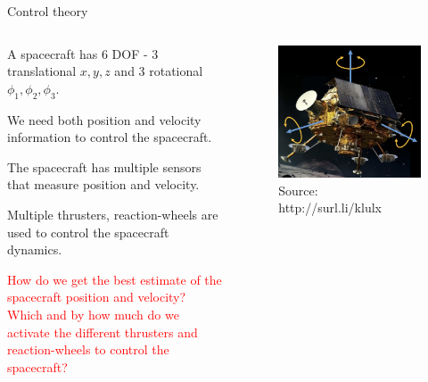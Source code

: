 \documentclass[aspectratio=169]{beamer}
\begin{document}
\begin{frame}{Control theory}
  \begin{columns}
    \begin{column}{0.5\textwidth}
      \vspace{0.2cm}
      A spacecraft has 6 DOF - 3 translational $x, y, z$ and 3 rotational $\phi_1, \phi_2, \phi_3$.

      We need both position and velocity information to control the spacecraft.
      \vspace{0.2cm}
      
      The spacecraft has multiple sensors that measure position and velocity.
      \vspace{0.2cm}
      
      Multiple thrusters, reaction-wheels are used to control the spacecraft dynamics.
      \vspace{0.2cm}

      \textcolor{red}{How do we get the best estimate of the spacecraft position and velocity? Which and by how much do we activate the different thrusters and reaction-wheels to control the spacecraft?}
    \end{column}
    \begin{column}{0.475\textwidth}
      \begin{figure}
        \centering
        \includegraphics[width=1\textwidth]{spacecraft.png}
        \caption{\scriptsize Source: http://surl.li/klulx}
      \end{figure}
    \end{column}    
  \end{columns}
\end{frame}
\end{document}
